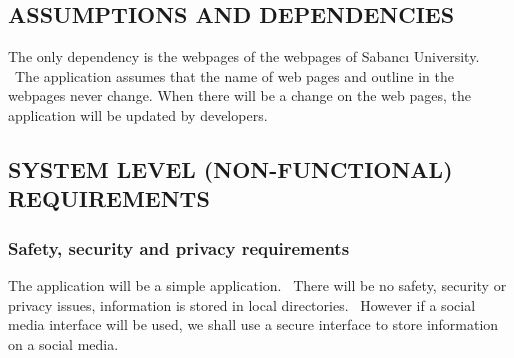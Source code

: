\documentclass[twoside,letterpaper]{article}
\begin{document}
\smallskip


\smallskip


\subsection[ASSUMPTIONS AND
DEPENDENCIES]{\rmfamily\bfseries\color{black}
ASSUMPTIONS AND DEPENDENCIES}

{\color{black}
The only dependency is the webpages of the webpages of Sabanc\i{} University. \ The application assumes that the name of web pages and outline in the webpages never change. When there will be a change on the web pages, the application will be updated by developers.  
}

\subsection[SYSTEM LEVEL (NON{}-FUNCTIONAL)
REQUIREMENTS]{\rmfamily\bfseries\color{black}
SYSTEM LEVEL (NON-FUNCTIONAL) REQUIREMENTS}

\subsubsection[Safety, security and privacy
requirements]{\rmfamily\bfseries\color{black}
Safety, security and privacy requirements}

{\color{black}
The application will be a simple application. \ There will be no safety, security or privacy issues, information is stored in local directories. \ However if a social media interface will be used, we shall use a secure interface to store information on a social media. }
\end{document}
